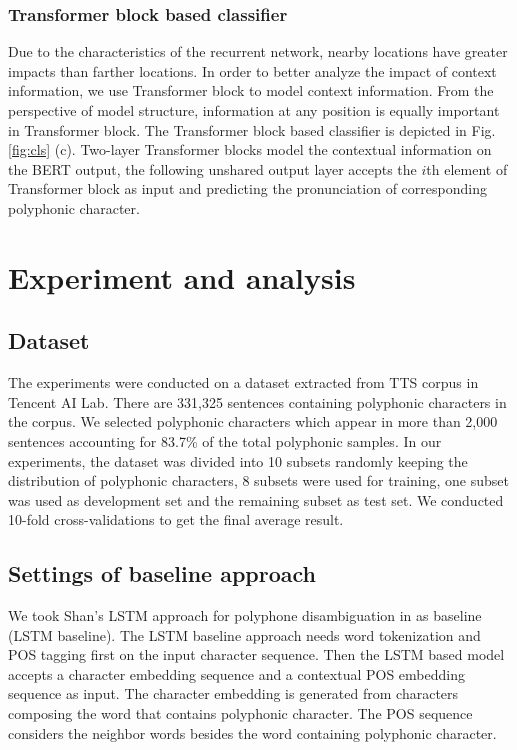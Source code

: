 \documentclass[a4paper]{article}
\begin{document}
\subsubsection{Transformer block based classifier}


Due to the characteristics of the recurrent network, nearby locations have greater impacts than farther locations. In order to better analyze the impact of context information, we use Transformer block to model context information. From the perspective of model structure, information at any position is equally important in Transformer block. The Transformer block based classifier is depicted in Fig.\ref{fig:cls} (c). Two-layer Transformer blocks model the contextual information on the BERT output, the following unshared output layer accepts the $i$th element of Transformer block as input and predicting the pronunciation of corresponding polyphonic character.



\section{Experiment and analysis}

\subsection{Dataset}

The experiments were conducted on a dataset extracted from TTS corpus in Tencent AI Lab. There  are 331,325 sentences containing polyphonic characters in the corpus. We selected polyphonic characters which appear in more than 2,000 sentences accounting for 83.7\% of the total polyphonic samples.  In our experiments, the dataset was divided into 10 subsets randomly keeping the distribution of polyphonic characters, 8 subsets were used for training, one subset was used as development set and the remaining subset as test set. We conducted 10-fold cross-validations to get the final average result.

\subsection{Settings of baseline approach}

We took Shan's LSTM approach for polyphone disambiguation  in \cite{shan2016bi} as baseline (LSTM baseline). The LSTM baseline approach needs word tokenization and POS tagging first on the input character sequence. Then the LSTM based model accepts a character embedding sequence and a contextual POS embedding sequence as input. The character embedding is generated from characters composing the word that contains polyphonic character. The POS sequence considers the neighbor words besides the word containing polyphonic character.
\end{document}
